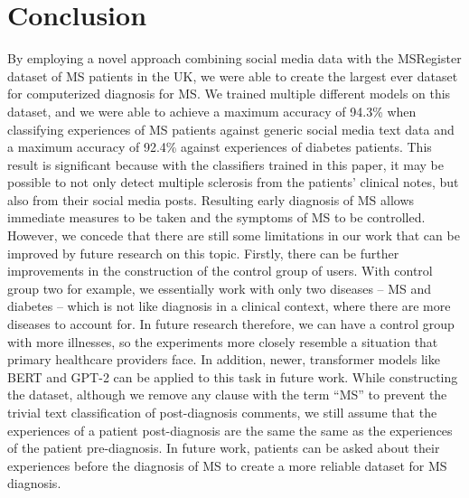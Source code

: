\documentclass[11pt,a4paper]{article}
\begin{document}
\section{Conclusion}
By employing a novel approach combining social media data with the MSRegister dataset of MS patients in the UK, we were able to create the largest ever dataset for computerized diagnosis for MS. We trained multiple different models on this dataset, and we were able to achieve a maximum accuracy of 94.3\% when classifying experiences of MS patients against generic social media text data and a maximum accuracy of 92.4\% against experiences of diabetes patients. This result is significant because with the classifiers trained in this paper, it may be possible to not only detect multiple sclerosis from the patients’ clinical notes, but also from their social media posts. Resulting early diagnosis of MS allows immediate measures to be taken and the symptoms of MS to be controlled. \\
\indent However, we concede that there are still some limitations in our work that can be improved by future research on this topic.  Firstly, there can be further improvements in the construction of the control group of users. With control group two for example, we essentially work with only two diseases – MS and diabetes – which is not like diagnosis in a clinical context, where there are more diseases to account for. In future research therefore, we can have a control group with more illnesses, so the experiments more closely resemble a situation that primary healthcare providers face. In addition, newer, transformer models like BERT and GPT-2 can be applied to this task in future work. While constructing the dataset, although we remove any clause with the term “MS” to prevent the trivial text classification of post-diagnosis comments, we still assume that the experiences of a patient post-diagnosis are the same the same as the experiences of the patient pre-diagnosis. In future work, patients can be asked about their experiences before the diagnosis of MS to create a more reliable dataset for MS diagnosis.


\appendix
\end{document}
